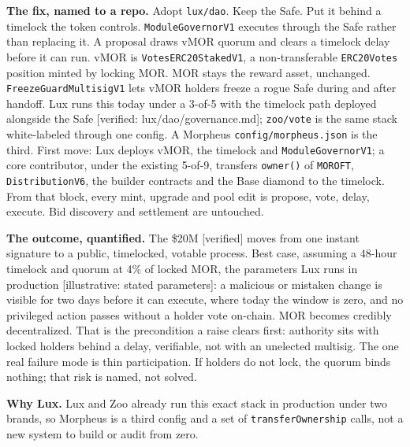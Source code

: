 \documentclass[11pt,a4paper]{article}
\newcommand{\code}[1]{\texttt{\small #1}}
\newcommand{\pv}[1]{{\color{muted}\sffamily\scriptsize[#1]}}
\begin{document}
\vspace{0.9ex}
\noindent\textbf{The fix, named to a repo.}
Adopt \code{lux/dao}. Keep the Safe. Put it behind a timelock the token controls.
\code{ModuleGovernorV1} executes through the Safe rather than replacing it. A proposal draws vMOR
quorum and clears a timelock delay before it can run. vMOR is \code{VotesERC20StakedV1}, a
non-transferable \code{ERC20Votes} position minted by locking MOR. MOR stays the reward asset,
unchanged. \code{FreezeGuardMultisigV1} lets vMOR holders freeze a rogue Safe during and after
handoff. Lux runs this today under a 3-of-5 with the timelock path deployed alongside the Safe
\pv{verified: lux/dao/governance.md}; \code{zoo/vote} is the same stack white-labeled through one
config. A Morpheus \code{config/morpheus.json} is the third. First move: Lux deploys vMOR, the
timelock and \code{ModuleGovernorV1}; a core contributor, under the existing 5-of-9, transfers
\code{owner()} of \code{MOROFT}, \code{DistributionV6}, the builder contracts and the Base diamond to
the timelock. From that block, every mint, upgrade and pool edit is propose, vote, delay, execute.
Bid discovery and settlement are untouched.

\vspace{0.9ex}
\noindent\textbf{The outcome, quantified.}
The \$20M \pv{verified} moves from one instant signature to a public, timelocked, votable process.
Best case, assuming a 48-hour timelock and quorum at 4\% of locked MOR, the parameters Lux runs in
production \pv{illustrative: stated parameters}: a malicious or mistaken change is visible for two
days before it can execute, where today the window is zero, and no privileged action passes without
a holder vote on-chain. MOR becomes credibly decentralized. That is the precondition a raise clears
first: authority sits with locked holders behind a delay, verifiable, not with an unelected multisig.
The one real failure mode is thin participation. If holders do not lock, the quorum binds nothing;
that risk is named, not solved.

\vspace{0.9ex}
\noindent\textbf{Why Lux.} Lux and Zoo already run this exact stack in production under two brands,
so Morpheus is a third config and a set of \code{transferOwnership} calls, not a new system to build
or audit from zero.

\vspace{0.8ex}
\end{document}
